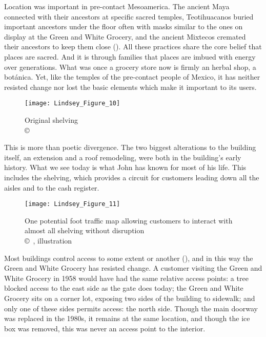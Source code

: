 Location was important in pre-contact Mesoamerica. The ancient Maya connected with their ancestors at specific sacred temples, Teotihuacanos buried important ancestors under the floor often with masks similar to the ones on display at the Green and White Grocery, and the ancient Mixtecos cremated their ancestors to keep them close (\cites[184]{ashmore}{linne}[7]{joyce}). All these practices share the core belief that places are sacred. And it is through families that places are imbued with energy over generations. What was once a grocery store now is firmly an herbal shop, a botánica. Yet, like the temples of the pre-contact people of Mexico, it has neither resisted change nor lost the basic elements which make it important to its users.

\begin{figure}[!htb]
	\texttt{[image: Lindsey\_Figure\_10]}
	\caption{Original shelving\\
		{\normalfont\scriptsize \copyright\
			\shortauthor
	}}
	\label{fig:Lindsey_Figure_10}
\end{figure}

This is more than poetic divergence. The two biggest alterations to the building itself, an extension and a roof remodeling, were both in the building's early history. What we see today is what John has known for most of his life. This includes the shelving, which provides a circuit for customers leading down all the aisles and to the cash register.

\begin{figure}[!htb]
	\texttt{[image: Lindsey\_Figure\_11]}
	\caption{One potential foot traffic map allowing customers to interact with almost all shelving without disruption\\
		{\normalfont\scriptsize \copyright\
			\shortauthor, illustration
	}}
	\label{fig:Lindsey_Figure_11}
\end{figure}

Most buildings control access to some extent or another (\cites{campion}[52]{glassie}), and in this way the Green and White Grocery has resisted change. A customer visiting the Green and White Grocery in 1958 would have had the same relative access points: a tree blocked access to the east side as the gate does today; the Green and White Grocery sits on a corner lot, exposing two sides of the building to sidewalk; and only one of these sides permits access: the north side. Though the main doorway was replaced in the 1980s, it remains at the same location, and though the ice box was removed, this was never an access point to the interior.

